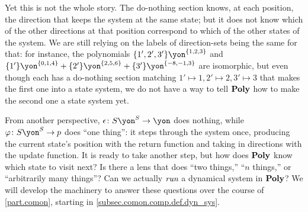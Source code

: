 \documentclass[Book-Poly]{subfiles}
\begin{document}
\begin{example}
Yet this is not the whole story.
The do-nothing section knows, at each position, the direction that keeps the system at the same state; but it does not know which of the other directions at that position correspond to which of the other states of the system.
We are still relying on the labels of direction-sets being the same for that: for instance, the polynomials $\{1',2',3'\}\yon^{\{1,2,3\}}$ and $\{1'\}\yon^{\{0,1,4\}}+\{2'\}\yon^{\{2,5,6\}}+\{3'\}\yon^{\{-8,-1,3\}}$ are isomorphic, but even though each has a do-nothing section matching $1'\mapsto1,2'\mapsto2,3'\mapsto3$ that makes the first one into a state system, we do not have a way to tell $\mathbf{Poly}$ how to make the second one a state system yet.

From another perspective, $\epsilon\colon S\yon^S\to\yon$ does nothing, while $\varphi\colon S\yon^S\to p$ does ``one thing'': it steps through the system once, producing the current state's position with the return function and taking in directions with the update function.
It is ready to take another step, but how does $\mathbf{Poly}$ know which state to visit next?
Is there a lens that does ``two things,'' ``$n$ things,'' or ``arbitrarily many things''?
Can we actually $\emph{run}$ a dynamical system in $\mathbf{Poly}$?
We will develop the machinery to answer these questions over the course of \cref{part.comon}, starting in \cref{subsec.comon.comp.def.dyn_sys}.
\end{example}
\end{document}
